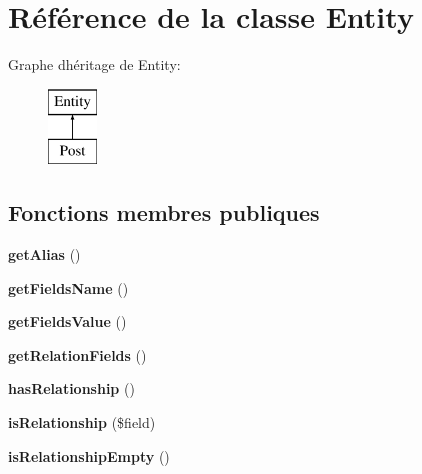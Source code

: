 \hypertarget{class_o_r_m_1_1_entity_1_1_entity}{}\section{Référence de la classe Entity}
\label{class_o_r_m_1_1_entity_1_1_entity}
Graphe d\textquotesingle{}héritage de Entity\+:\begin{figure}[H]
\begin{center}
\leavevmode
\includegraphics[height=2.000000cm]{class_o_r_m_1_1_entity_1_1_entity}
\end{center}
\end{figure}
\subsection*{Fonctions membres publiques}
\begin{DoxyCompactItemize}
\item 
{\bfseries get\+Alias} ()\hypertarget{class_o_r_m_1_1_entity_1_1_entity_a26e3e0c627051b4287204b3575b81d97}{}\label{class_o_r_m_1_1_entity_1_1_entity_a26e3e0c627051b4287204b3575b81d97}

\item 
{\bfseries get\+Fields\+Name} ()\hypertarget{class_o_r_m_1_1_entity_1_1_entity_a0829809ba45c68eb2c432eb259000e1e}{}\label{class_o_r_m_1_1_entity_1_1_entity_a0829809ba45c68eb2c432eb259000e1e}

\item 
{\bfseries get\+Fields\+Value} ()\hypertarget{class_o_r_m_1_1_entity_1_1_entity_a18215cfa4a73b927bc7619abee1f5865}{}\label{class_o_r_m_1_1_entity_1_1_entity_a18215cfa4a73b927bc7619abee1f5865}

\item 
{\bfseries get\+Relation\+Fields} ()\hypertarget{class_o_r_m_1_1_entity_1_1_entity_ac50bf20e4b393e55482792114a65bf91}{}\label{class_o_r_m_1_1_entity_1_1_entity_ac50bf20e4b393e55482792114a65bf91}

\item 
{\bfseries has\+Relationship} ()\hypertarget{class_o_r_m_1_1_entity_1_1_entity_afc476d3a3bd3a526a9b9bac78fe23bab}{}\label{class_o_r_m_1_1_entity_1_1_entity_afc476d3a3bd3a526a9b9bac78fe23bab}

\item 
{\bfseries is\+Relationship} (\$field)\hypertarget{class_o_r_m_1_1_entity_1_1_entity_a7de6be41243508539206c394715ec048}{}\label{class_o_r_m_1_1_entity_1_1_entity_a7de6be41243508539206c394715ec048}

\item 
{\bfseries is\+Relationship\+Empty} ()\hypertarget{class_o_r_m_1_1_entity_1_1_entity_ad383aa2cc8f1cbf3ba055b50573965b3}{}\label{class_o_r_m_1_1_entity_1_1_entity_ad383aa2cc8f1cbf3ba055b50573965b3}

\end{DoxyCompactItemize}
